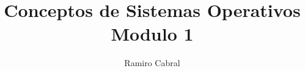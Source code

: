 \documentclass[12pt]{article}
\title{\Huge{Conceptos de Sistemas Operativos\\
Modulo 1}}
\author{\huge{Ramiro Cabral}}
\date{\huge{}}
\begin{document}
\maketitle
\tableofcontents
\pagebreak





\end{document}
